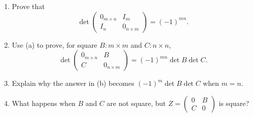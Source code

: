 \begin{problem}\label{ex:05:antidiagonal}
\begin{enumerate}
\item Prove that
\[
\det\begin{pmatrix}0_{m\times n}&I_m\\I_n&0_{n\times m}\end{pmatrix}
=(-1)^{mn}.
\]
\item Use (a) to prove, for square \(B:m\times m\) and \(C:n\times n\),
\[
\det\begin{pmatrix}0_{m\times n}&B\\C&0_{n\times m}\end{pmatrix}
=(-1)^{mn}\det B\det C.
\]
\item Explain why the answer in (b) becomes \((-1)^m\det B\det C\)
when \(m=n\).
\item What happens when \(B\) and \(C\) are not square, but
\(Z=\begin{pmatrix}0&B\\C&0\end{pmatrix}\) is square?
\end{enumerate}
\end{problem}
